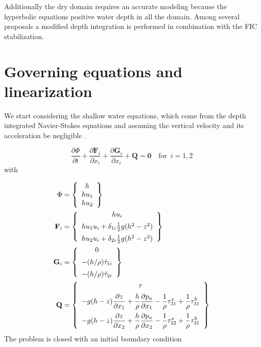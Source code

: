 \documentclass[a4paper,12pt]{article}
\newcommand{\pder}[2]{\frac{\partial#1}{\partial#2}}
\begin{document}
Additionally the dry domain requires an accurate modeling because the hyperbolic equations positive water depth in all the domain. Among several proposals \cite{heniche2000}\cite{candy2017}\cite{barros2011} a modified depth integration \cite{defina2000} is performed in combination with the FIC stabilization.

\section{Governing equations and linearization}

We start considering the shallow water equations, which come from the depth integrated Navier-Stokes equations and  assuming the vertical velocity and its acceleration be negligible \cite{zien3}.

\begin{equation} \label{general_sw}
\pder{\Phi}{t} + \pder{\mathbf{F}_i}{x_i} + \pder{\mathbf{G}_i}{x_i} + \mathbf{Q} = \mathbf{0} \quad \text{for} \enspace i=1,2
\end{equation}
with

\begin{subequations}
\allowdisplaybreaks
\begin{align} \label{variables_and_fluxes}
\Phi &= \left\{
    \begin{array}{c}
        h \\
        hu_1 \\
        hu_2
    \end{array}\right\} \\
\mathbf{F}_i &= \left\{
    \begin{array}{c}
        hu_i \\ [5pt]
        hu_1u_i + \delta_{1i}\frac{1}{2}g(h^2 - z^2) \\ [5pt]
        hu_2u_i + \delta_{2i}\frac{1}{2}g(h^2 - z^2)
    \end{array}\right\} \\
\mathbf{G}_i &= \left\{
    \begin{array}{c}
        0 \\ [5pt]
        -(h/\rho) \bar{\tau}_{1i} \\ [5pt]
        -(h/\rho) \bar{\tau}_{2i}
    \end{array}\right\} \\
\mathbf{Q} &= \left\{
    \begin{array}{c}
        r \\ [5pt]
        \displaystyle -g(h-z)\pder{z}{x_1} + \frac{h}{\rho}\pder{p_a}{x_1}
        - \frac{1}{\rho}\tau^s_{31} + \frac{1}{\rho}\tau^b_{31} \\ [10pt]
        \displaystyle -g(h-z)\pder{z}{x_2} + \frac{h}{\rho}\pder{p_a}{x_2}
        - \frac{1}{\rho}\tau^s_{32} + \frac{1}{\rho}\tau^b_{31}
    \end{array}\right\}
\end{align}
\end{subequations}
The problem is closed with an initial boundary condition
\end{document}
